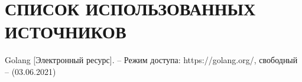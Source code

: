 \section*{СПИСОК ИСПОЛЬЗОВАННЫХ ИСТОЧНИКОВ}

\begingroup
\renewcommand{\section}[2]{}
\begin{thebibliography}{}
	Golang [Электронный ресурс]. – Режим доступа: 
	https://golang.org/,
	свободный – (03.06.2021)
\end{thebibliography}
\endgroup

\pagebreak